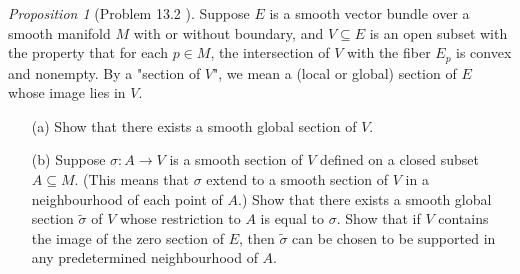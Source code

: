 \documentclass[a4paper]{article}
\theoremstyle{remark}
\newtheorem{prop}{Proposition}
\newcommand{\subhim}{\subseteq} %
\newcommand\wtilde[1]{\widetilde{#1}} %
\begin{document}
\begin{prop}[Problem 13.2 \cite{LeeSM}]
Suppose $E$ is a smooth vector bundle over a smooth manifold $M$ with or without boundary, and $V \subhim E$ is an open subset with the property that for each $p \in M$, the intersection of $V$ with the fiber $E_p$ is convex and nonempty. By a "section of $V$", we mean a (local or global) section of $E$ whose image lies in $V$.
\begin{enumerate}[nolistsep]
\item[(a)] Show that there exists a smooth global section of $V$.
\item[(b)] Suppose $\sigma : A \to V$ is a smooth section of $V$ defined on a closed subset $A \subhim M$. (This means that $\sigma$ extend to a smooth section of $V$ in a neighbourhood of each point of $A$.) Show that there exists a smooth global section $\wtilde{\sigma}$ of $V$ whose restriction to $A$ is equal to $\sigma$. Show that if $V$ contains the image of the zero section of $E $, then $\wtilde{\sigma} $ can be chosen to be supported in any predetermined neighbourhood of $A$.
\end{enumerate} 
\end{prop}
\end{document}
